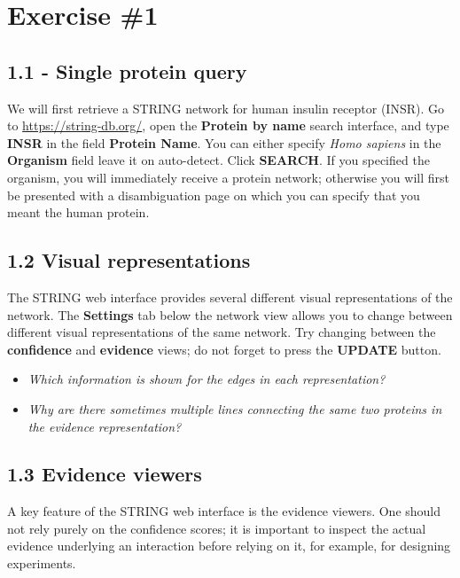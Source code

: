 \documentclass[a4paper]{article}
\begin{document}
\section*{Exercise \#1}

\vspace{0,5cm}

\subsection*{1.1 - Single protein query}
We will first retrieve a STRING network for human insulin receptor (INSR). Go to \url{https://string-db.org/}, open the \textbf{Protein by name} search interface, and type \textbf{INSR} in the field \textbf{Protein Name}. You can either specify \textit{Homo sapiens} in the \textbf{Organism} field leave it on auto-detect. Click \textbf{SEARCH}. If you specified the organism, you will immediately receive a protein network; otherwise you will first be presented with a disambiguation page on which you can specify that you meant the human protein.

\vspace{0,5cm}

\subsection*{1.2 Visual representations}
The STRING web interface provides several different visual representations of the network. The \textbf{Settings} tab below the network view allows you to change between different visual representations of the same network. Try changing between the \textbf{confidence} and \textbf{evidence} views; do not forget to press the \textbf{UPDATE} button.
\begin{itemize}
  \item \textit{Which information is shown for the edges in each representation?}
  \item \textit{Why are there sometimes multiple lines connecting the same two proteins in the evidence representation?}
\end{itemize}

\vspace{0,5cm}

\subsection*{1.3 Evidence viewers}
A key feature of the STRING web interface is the evidence viewers. One should not rely purely on the confidence scores; it is important to inspect the actual evidence underlying an interaction before relying on it, for example, for designing experiments.
\end{document}
